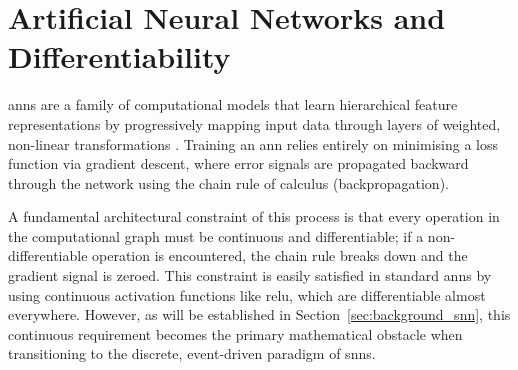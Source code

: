 \section{Artificial Neural Networks and Differentiability}
\label{sec:background_ann}

\glspl{ann} are a family of computational models that learn hierarchical feature representations by progressively mapping
input data through layers of weighted, non-linear transformations \cite{lecun2015deep}. 
Training an \gls{ann} relies entirely on minimising a loss function via gradient descent, where error signals are
propagated backward through the network using the chain rule of calculus (backpropagation). 

A fundamental architectural constraint of this process is that every operation in the computational graph must be
continuous and differentiable; if a non-differentiable operation is encountered, the chain rule breaks down and the
gradient signal is zeroed.
This constraint is easily satisfied in standard \glspl{ann} by using continuous activation functions like \gls{relu},
which are differentiable almost everywhere. 
However, as will be established in Section~\ref{sec:background_snn}, this continuous requirement becomes the primary
mathematical obstacle when transitioning to the discrete, event-driven paradigm of \glspl{snn}.